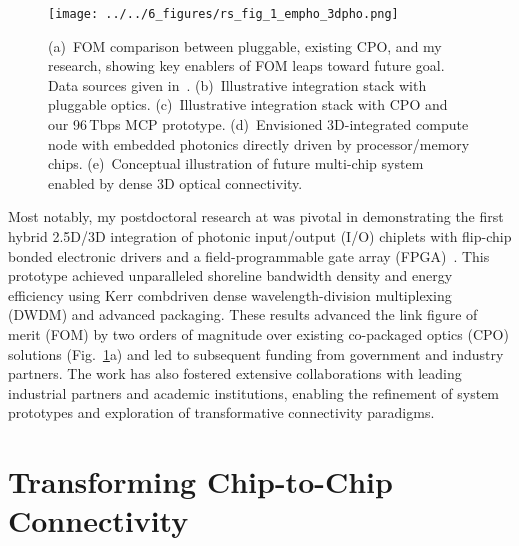 \begin{figure}
    \vspace{0.1em}
    \begin{center}
        \texttt{[image: ../../6\_figures/rs\_fig\_1\_empho\_3dpho.png]}
    \end{center}
    \caption{(a)~FOM comparison between pluggable, existing CPO, and my research, showing key enablers of FOM leaps toward future goal. Data sources given in~\cite{wangCoDesignedSiliconPhotonics2024}. (b)~Illustrative integration stack with pluggable optics. (c)~Illustrative integration stack with CPO and our 96\,Tbps MCP prototype. (d)~Envisioned 3D-integrated compute node with embedded photonics directly driven by processor/memory chips. (e)~Conceptual illustration of future multi-chip system enabled by dense 3D optical connectivity.}
    \label{fig:embedded_photonics}
\end{figure}

Most notably, my postdoctoral research at \mySchoolShort{} was pivotal in demonstrating the first hybrid 2.5D/3D integration of photonic input/output (I/O) chiplets with flip-chip bonded electronic drivers and a field-programmable gate array (FPGA)~\cite{wangSiliconPhotonicsChip2024,wangCoDesignedSiliconPhotonics2024,RovinskiISCAS25}. This prototype achieved unparalleled shoreline bandwidth density and energy efficiency using Kerr comb\textendash{}driven dense wavelength-division multiplexing (DWDM) and advanced packaging. These results advanced the link figure of merit (FOM) by two orders of magnitude over existing co-packaged optics (CPO) solutions (Fig.~\ref{fig:embedded_photonics}a) and led to subsequent funding from government and industry partners. The work has also fostered extensive collaborations with leading industrial partners and academic institutions, enabling the refinement of system prototypes and exploration of transformative connectivity paradigms.

\section*{Transforming Chip-to-Chip Connectivity}

